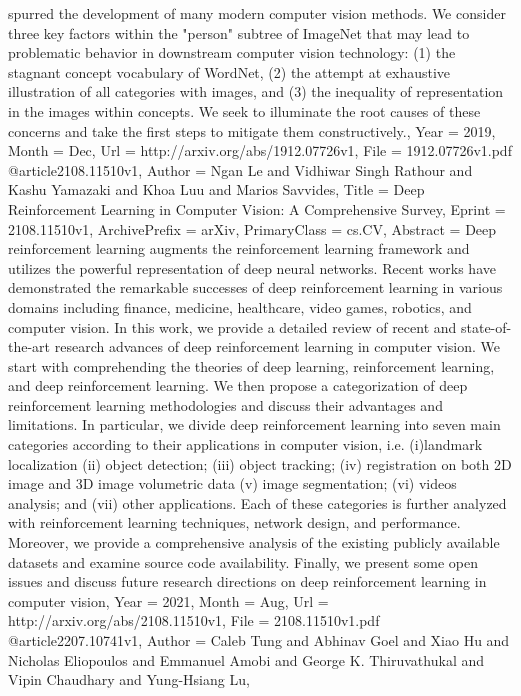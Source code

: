 {{{{spurred the development of many modern computer vision methods. We consider
three key factors within the "person" subtree of ImageNet that may lead to
problematic behavior in downstream computer vision technology: (1) the stagnant
concept vocabulary of WordNet, (2) the attempt at exhaustive illustration of
all categories with images, and (3) the inequality of representation in the
images within concepts. We seek to illuminate the root causes of these concerns
and take the first steps to mitigate them constructively.},
Year          = {2019},
Month         = {Dec},
Url           = {http://arxiv.org/abs/1912.07726v1},
File          = {1912.07726v1.pdf}
}
@article{2108.11510v1,
Author        = {Ngan Le and Vidhiwar Singh Rathour and Kashu Yamazaki and Khoa Luu and Marios Savvides},
Title         = {Deep Reinforcement Learning in Computer Vision: A Comprehensive Survey},
Eprint        = {2108.11510v1},
ArchivePrefix = {arXiv},
PrimaryClass  = {cs.CV},
Abstract      = {Deep reinforcement learning augments the reinforcement learning framework and
utilizes the powerful representation of deep neural networks. Recent works have
demonstrated the remarkable successes of deep reinforcement learning in various
domains including finance, medicine, healthcare, video games, robotics, and
computer vision. In this work, we provide a detailed review of recent and
state-of-the-art research advances of deep reinforcement learning in computer
vision. We start with comprehending the theories of deep learning,
reinforcement learning, and deep reinforcement learning. We then propose a
categorization of deep reinforcement learning methodologies and discuss their
advantages and limitations. In particular, we divide deep reinforcement
learning into seven main categories according to their applications in computer
vision, i.e. (i)landmark localization (ii) object detection; (iii) object
tracking; (iv) registration on both 2D image and 3D image volumetric data (v)
image segmentation; (vi) videos analysis; and (vii) other applications. Each of
these categories is further analyzed with reinforcement learning techniques,
network design, and performance. Moreover, we provide a comprehensive analysis
of the existing publicly available datasets and examine source code
availability. Finally, we present some open issues and discuss future research
directions on deep reinforcement learning in computer vision},
Year          = {2021},
Month         = {Aug},
Url           = {http://arxiv.org/abs/2108.11510v1},
File          = {2108.11510v1.pdf}
}
@article{2207.10741v1,
Author        = {Caleb Tung and Abhinav Goel and Xiao Hu and Nicholas Eliopoulos and Emmanuel Amobi and George K. Thiruvathukal and Vipin Chaudhary and Yung-Hsiang Lu},
}}}
